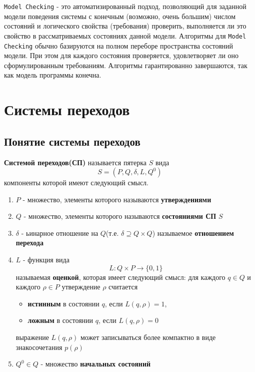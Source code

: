 \documentclass[12pt, twoside]{report}
\begin{document}
\texttt{Model Checking\cite{Shalito:ModelChecking}} - это автоматизированный подход, позволяющий для заданной модели поведения
системы с конечным (возможно, очень большим) числом состояний и логического свойства
(требования) проверить, выполняется ли это свойство в рассматриваемых состояниях данной модели.
Алгоритмы для \texttt{Model Checking} обычно базируются на полном переборе пространства состояний модели.
При этом для каждого состояния проверяется, удовлетворяет ли оно сформулированным требованиям.
Алгоритмы гарантированно завершаются, так как модель программы конечна.

\newpage
\section*{Системы переходов\cite{Mironov:ModelChecking}}
\label{system_SEQUENCE}

\subsection*{Понятие системы переходов}
\label{system_sequence_BASE}
\textbf{Системой переходов(СП)} называется пятерка $S$ вида
\begin{equation}\label{formula:1}
S = (P, Q, \delta, L, Q^0)
\end{equation}
компоненты которой имеют следующий смысл.
\begin{enumerate}
  \item $P$ - множество, элементы которого называются \textbf{утверждениями}
  \item $Q$ - множество, элементы которого называются \textbf{состояниями СП} $S$
  \item $\delta$ - ьинарное отношение на $Q$(т.е. $\delta \supseteq Q \times Q$) называемое
        \textbf{отношением перехода}
  \item $L$ - функция вида
        \begin{equation}
		  L : Q \times P \to \{0, 1\}
		\end{equation}
		называемая \textbf{оценкой}, которая имеет следующий смысл: для каждого $q \in Q$ и
		каждого $\rho \in P$ утверждение $\rho$ считается
		\begin{itemize}
		  \item \textbf{истинным} в состоянии $q$, если $L(q,\rho) = 1$,
		  \item \textbf{ложным} в состоянии $q$, если $L(q,\rho) = 0$
		\end{itemize}
		выражение $L(q,\rho)$ может записываться более компактно в виде знакосочетания $p(\rho)$
  \item $Q^0 \in Q$ - множество \textbf{начальных состояний}
\end{enumerate}
\end{document}
